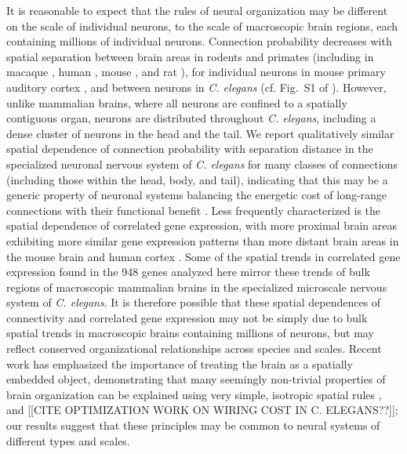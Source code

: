 \documentclass[10pt,letterpaper]{article}
\begin{document}
{It is reasonable to expect that the rules of neural organization may be different on the scale of individual neurons, to the scale of macroscopic brain regions, each containing millions of individual neurons.
Connection probability decreases with spatial separation between brain areas in rodents and primates \cite{Horvat:2016ia, Wang:2016gg} (including in macaque \cite{Markov:2013jo}, human \cite{Henderson:2014fg}, mouse \cite{Fulcher:2016ck}, and rat \cite{Noori:2017ce}), for individual neurons in mouse primary auditory cortex \cite{Levy:2012dy}, and between neurons in \emph{C. elegans} (cf. Fig.~S1 of \cite{Azulay:2016cg}).
However, unlike mammalian brains, where all neurons are confined to a spatially contiguous organ, neurons are distributed throughout \emph{C. elegans}, including a dense cluster of neurons in the head and the tail.
We report qualitatively similar spatial dependence of connection probability with separation distance in the specialized neuronal nervous system of \emph{C. elegans} for many classes of connections (including those within the head, body, and tail), indicating that this may be a generic property of neuronal systems balancing the energetic cost of long-range connections with their functional benefit \cite{vandenHeuvel:2012kh, Kim:2014bu}.
Less frequently characterized is the spatial dependence of correlated gene expression, with more proximal brain areas exhibiting more similar gene expression patterns than more distant brain areas in the mouse brain \cite{Fulcher:2016ck} and human cortex \cite{Krienen:2016eq, Pantazatos:2016ir, Richiardi:2017hb}.
Some of the spatial trends in correlated gene expression found in the 948 genes analyzed here mirror these trends of bulk regions of macroscopic mammalian brains in the specialized microscale nervous system of \emph{C. elegans}.
It is therefore possible that these spatial dependences of connectivity and correlated gene expression may not be simply due to bulk spatial trends in macroscopic brains containing millions of neurons, but may reflect conserved organizational relationships across species and scales.
Recent work has emphasized the importance of treating the brain as a spatially embedded object, demonstrating that many seemingly non-trivial properties of brain organization can be explained using very simple, isotropic spatial rules \cite{Henderson:2014fg, Roberts2016, Horvat:2016ia}, and [[CITE OPTIMIZATION WORK ON WIRING COST IN C. ELEGANS??]]; our results suggest that these principles may be common to neural systems of different types and scales.


}
\end{document}
